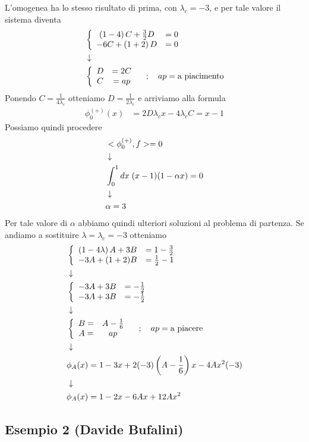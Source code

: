\begin{enumerate}
	L'omogenea ha lo stesso risultato di prima, con $\lambda_c = -3$, e per tale valore il sistema diventa
	\begin{align}
		&\left\{ \begin{array}{cc} \left(1 -4 \right) C + \frac{3}{2} D &= 0\\ -6 C + \left( 1 +2 \right) D &=0 \end{array} \right. \\ &\downarrow \nonumber \\
		 &\left\{ \begin{array}{cc} D &= 2C\\ C &= ap \end{array} \right. \quad ; \quad ap = \text{a piacimento}
	\end{align}
	Ponendo $C = \frac{1}{4\lambda_c}$ otteniamo $D = \frac{1}{2 \lambda_c}$ e arriviamo alla formula
	\begin{align}
		\phi_0^{(+)}(x) &= 2D \lambda_c x - 4 \lambda_c C = x-1
	\end{align}
	Possiamo quindi procedere
	\begin{align}
		&<\phi_0^{(+)},f> = 0 \\ &\downarrow \nonumber \\
		&\int_{0}^{1} dx \; (x-1) (1-\alpha x) =0\nonumber \\ &\downarrow \nonumber \\
		&\alpha = 3
	\end{align}
	Per tale valore di $\alpha$ abbiamo quindi ulteriori soluzioni al problema di partenza. Se andiamo a sostituire $\lambda = \lambda_c = -3$ otteniamo
	\begin{align}
		&\left\{ \begin{array}{cc} \left(1 -4 \lambda\right) A +3B &= 1 - \frac{3}{2}\\ -3A + (1+2)B &= \frac{1}{2}-1 \end{array} \right. \\ &\downarrow \nonumber \\
		&\left\{ \begin{array}{cc} -3A +3B &= - \frac{1}{2}\\ -3A + 3B &= -\frac{1}{2} \end{array} \right. \nonumber \\ &\downarrow \nonumber \\
		&\left\{ \begin{array}{cc} B = &A - \frac{1}{6}\\ A = &ap \end{array} \right. \quad ; \quad ap= \text{a piacere} \nonumber \\ &\downarrow \nonumber \\
		&\phi_A(x) = 1 -3x +2 (-3)\left(A - \frac{1}{6}\right)x -4Ax^2(-3) \nonumber \\ &\downarrow \nonumber \\
		&\phi_A(x) = 1 -2x -6Ax +12Ax^2
	\end{align}
\end{enumerate}

\newpage

\subsection{Esempio 2 (Davide Bufalini)}

